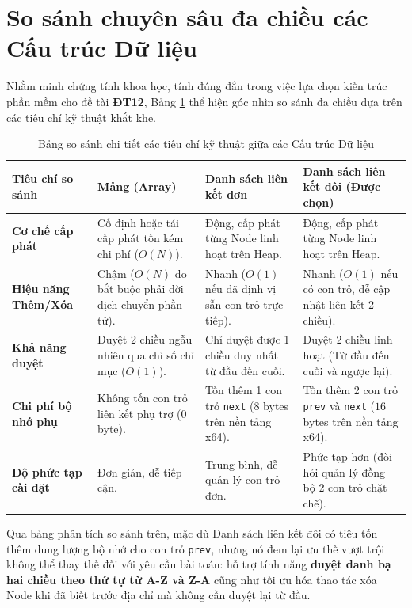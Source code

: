 \section{So sánh chuyên sâu đa chiều các Cấu trúc Dữ liệu}

Nhằm minh chứng tính khoa học, tính đúng đắn trong việc lựa chọn kiến trúc phần mềm cho đề tài \textbf{ĐT12}, Bảng \ref{tab:so_sanh_ctdl} thể hiện góc nhìn so sánh đa chiều dựa trên các tiêu chí kỹ thuật khắt khe.

\begin{table}[htbp]
\centering
\caption{Bảng so sánh chi tiết các tiêu chí kỹ thuật giữa các Cấu trúc Dữ liệu}
\label{tab:so_sanh_ctdl}
\small
\begin{tabular}{|p{2.5cm}|p{3.2cm}|p{3.5cm}|p{3.8cm}|}
\hline
\textbf{Tiêu chí so sánh} & \textbf{Mảng (Array)} & \textbf{Danh sách liên kết đơn} & \textbf{Danh sách liên kết đôi (Được chọn)} \\ \hline
\textbf{Cơ chế cấp phát} & Cố định hoặc tái cấp phát tốn kém chi phí ($O(N)$). & Động, cấp phát từng Node linh hoạt trên Heap. & Động, cấp phát từng Node linh hoạt trên Heap. \\ \hline
\textbf{Hiệu năng Thêm/Xóa} & Chậm ($O(N)$ do bắt buộc phải dời dịch chuyển phần tử). & Nhanh ($O(1)$ nếu đã định vị sẵn con trỏ trực tiếp). & Nhanh ($O(1)$ nếu có con trỏ, dễ cập nhật liên kết 2 chiều). \\ \hline
\textbf{Khả năng duyệt} & Duyệt 2 chiều ngẫu nhiên qua chỉ số chỉ mục ($O(1)$). & Chỉ duyệt được 1 chiều duy nhất từ đầu đến cuối. & Duyệt 2 chiều linh hoạt (Từ đầu đến cuối và ngược lại). \\ \hline
\textbf{Chi phí bộ nhớ phụ} & Không tốn con trỏ liên kết phụ trợ ($0$ byte). & Tốn thêm 1 con trỏ \texttt{next} ($8$ bytes trên nền tảng x64). & Tốn thêm 2 con trỏ \texttt{prev} và \texttt{next} ($16$ bytes trên nền tảng x64). \\ \hline
\textbf{Độ phức tạp cài đặt} & Đơn giản, dễ tiếp cận. & Trung bình, dễ quản lý con trỏ đơn. & Phức tạp hơn (đòi hỏi quản lý đồng bộ 2 con trỏ chặt chẽ). \\ \hline
\end{tabular}
\end{table}

Qua bảng phân tích so sánh trên, mặc dù Danh sách liên kết đôi có tiêu tốn thêm dung lượng bộ nhớ cho con trỏ \texttt{prev}, nhưng nó đem lại ưu thế vượt trội không thể thay thế đối với yêu cầu bài toán: hỗ trợ tính năng \textbf{duyệt danh bạ hai chiều theo thứ tự từ A-Z và Z-A} cũng như tối ưu hóa thao tác xóa Node khi đã biết trước địa chỉ mà không cần duyệt lại từ đầu.

